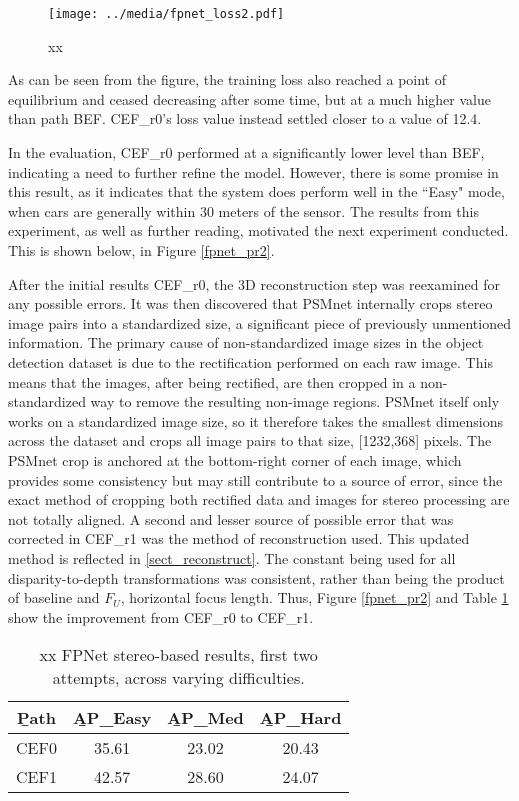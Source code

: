 \begin{figure}[ht]
	\centering
	\texttt{[image: ../media/fpnet\_loss2.pdf]}
	\caption{xx}
	\label{fpnet_loss2}
\end{figure}

As can be seen from the figure, the training loss also reached a point of equilibrium and ceased decreasing after some time, but at a much higher value than path BEF. CEF\_r0's loss value instead settled closer to a value of 12.4. 

In the evaluation, CEF\_r0 performed at a significantly lower level than BEF, indicating a need to further refine the model. However, there is some promise in this result, as it indicates that the system does perform well in the ``Easy" mode, when cars are generally within 30 meters of the sensor. The results from this experiment, as well as further reading, motivated the next experiment conducted. This is shown below, in Figure \ref{fpnet_pr2}.

After the initial results CEF\_r0, the 3D reconstruction step was reexamined for any possible errors. It was then discovered that PSMnet internally crops stereo image pairs into a standardized size, a significant piece of previously unmentioned information. The primary cause of non-standardized image sizes in the object detection dataset is due to the rectification performed on each raw image. This means that the images, after being rectified, are then cropped in a non-standardized way to remove the resulting non-image regions. PSMnet itself only works on a standardized image size, so it therefore takes the smallest dimensions across the dataset and crops all image pairs to that size, [1232,368] pixels. The PSMnet crop is anchored at the bottom-right corner of each image, which provides some consistency but may still contribute to a source of error, since the exact method of cropping both rectified data and images for stereo processing are not totally aligned. A second and lesser source of possible error that was corrected in CEF\_r1 was the method of reconstruction used. This updated method is reflected in \ref{sect_reconstruct}. The constant being used for all disparity-to-depth transformations was consistent, rather than being the product of baseline and $F_U$, horizontal focus length. Thus, Figure \ref{fpnet_pr2} and Table \ref{fpnet_ap2} show the improvement from CEF\_r0 to CEF\_r1. 

\begin{table}[ht]
	\centering
	\caption{xx FPNet stereo-based results, first two attempts, across varying difficulties.}
	\begin{tabular}{|c|c|c|c|}
		\hline
		\b{Path} & \b{AP\_Easy} & \b{AP\_Med} & \b{AP\_Hard} \\ \hline
		CEF0   &    35.61     &    23.02    &    20.43     \\ \hline
		CEF1   &    42.57     &    28.60    &    24.07     \\ \hline
	\end{tabular}
	\label{fpnet_ap2}
\end{table}


